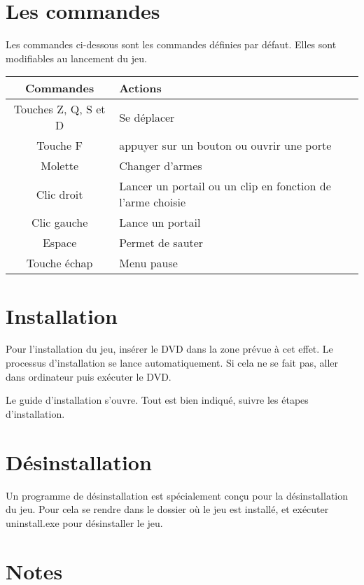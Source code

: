\documentclass[12pt]{article}
\begin{document}
\newpage

\section{Les commandes}

Les commandes ci-dessous sont les commandes définies par défaut. Elles sont modifiables au lancement du jeu.

\quad



\begin{tabular}{|c|p{7 cm}|}
\hline Commandes & Actions \\
\hline Touches Z, Q, S et D & Se déplacer \\
\hline Touche F & appuyer sur un bouton ou ouvrir une porte\\
\hline Molette & Changer d'armes\\
\hline Clic droit & Lancer un portail ou un clip en fonction de l'arme choisie\\
\hline Clic gauche & Lance un portail\\
\hline Espace & Permet de sauter\\
\hline Touche échap & Menu pause \\
\hline

\end{tabular}


\newpage

\section{Installation}


Pour l'installation du jeu, insérer le DVD dans la zone prévue à cet effet. Le processus d'installation se lance automatiquement. Si cela ne se fait pas, aller dans ordinateur puis exécuter le DVD.


Le guide d'installation s'ouvre. Tout est bien indiqué, suivre les étapes d'installation.

\section{Désinstallation}


Un programme de désinstallation est spécialement conçu pour la désinstallation du jeu. Pour cela se rendre dans le dossier où le jeu est installé, et exécuter uninstall.exe pour désinstaller le jeu.

\newpage

\section{Notes}
\end{document}
